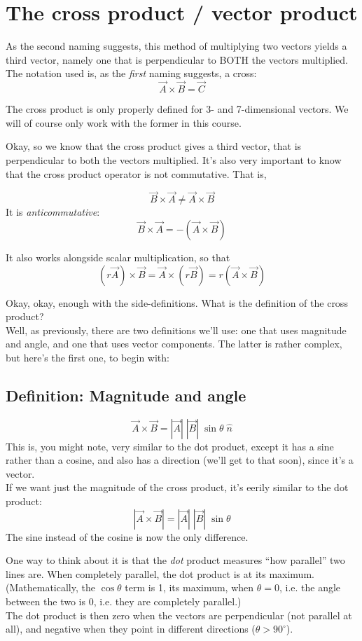 \documentclass[12pt,a4paper]{report}
\begin{document}
\section{The cross product / vector product}
As the second naming suggests, this method of multiplying two vectors yields a third vector, namely one that is perpendicular to BOTH the vectors multiplied.\\
The notation used is, as the \emph{first} naming suggests, a cross:
\[ \vec{A} \times \vec{B} = \vec{C} \]

The cross product is only properly defined for 3- and 7-dimensional vectors. We will of course only work with the former in this course.

Okay, so we know that the cross product gives a third vector, that is perpendicular to both the vectors multiplied. It's also very important to know that the cross product operator is not commutative. That is,

\[ \vec{B} \times \vec{A} \neq \vec{A} \times \vec{B} \]
It is \emph{anticommutative}:
\[ \vec{B} \times \vec{A} = -(\vec{A} \times \vec{B}) \]

It also works alongside scalar multiplication, so that
\[ (r \vec{A}) \times \vec{B} = \vec{A} \times (r \vec{B}) = r(\vec{A} \times \vec{B}) \]

Okay, okay, enough with the side-definitions. What is the definition of the cross product?\\
Well, as previously, there are two definitions we'll use: one that uses magnitude and angle, and one that uses vector components. The latter is rather complex, but here's the first one, to begin with: \subsection{Definition: Magnitude and angle}

\[ \vec{A} \times \vec{B} = |\vec{A}| \; |\vec{B}| \; \sin{\theta} \; \hat{n} \]
This is, you might note, very similar to the dot product, except it has a sine rather than a cosine, and also has a direction (we'll get to that soon), since it's a vector.\\
If we want just the magnitude of the cross product, it's eerily similar to the dot product:
\[ |\vec{A} \times \vec{B}| = |\vec{A}| \; |\vec{B}| \; \sin{\theta} \]
The sine instead of the cosine is now the only difference.

One way to think about it is that the \emph{dot} product measures ``how parallel'' two lines are. When completely parallel, the dot product is at its maximum. (Mathematically, the $\cos{\theta}$ term is 1, its maximum, when $\theta = 0$, i.e. the angle between the two is 0, i.e. they are completely parallel.)\\
The dot product is then zero when the vectors are perpendicular (not parallel at all), and negative when they point in different directions ($\theta > 90^\circ$).
\end{document}
